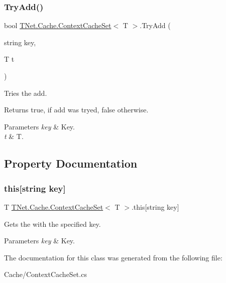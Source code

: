\subsubsection{\texorpdfstring{Try\+Add()}{TryAdd()}}
{\footnotesize\ttfamily bool \mbox{\hyperlink{class_t_net_1_1_cache_1_1_context_cache_set}{T\+Net.\+Cache.\+Context\+Cache\+Set}}$<$ T $>$.Try\+Add (\begin{DoxyParamCaption}\item[{string}]{key,  }\item[{T}]{t }\end{DoxyParamCaption})}



Tries the add. 

\begin{DoxyReturn}{Returns}
{\ttfamily true}, if add was tryed, {\ttfamily false} otherwise.
\end{DoxyReturn}

\begin{DoxyParams}{Parameters}
{\em key} & Key.\\
\hline
{\em t} & T.\\
\hline
\end{DoxyParams}


\subsection{Property Documentation}
\mbox{\label{class_t_net_1_1_cache_1_1_context_cache_set_a531aa68b88d3162196fc3c9f4faa884e}} 
\subsubsection{\texorpdfstring{this[string key]}{this[string key]}}
{\footnotesize\ttfamily T \mbox{\hyperlink{class_t_net_1_1_cache_1_1_context_cache_set}{T\+Net.\+Cache.\+Context\+Cache\+Set}}$<$ T $>$.this\mbox{[}string key\mbox{]}\hspace{0.3cm}{\ttfamily [get]}}



Gets the with the specified key. 


\begin{DoxyParams}{Parameters}
{\em key} & Key.\\
\hline
\end{DoxyParams}


The documentation for this class was generated from the following file\+:\begin{DoxyCompactItemize}
\item 
Cache/Context\+Cache\+Set.\+cs\end{DoxyCompactItemize}
